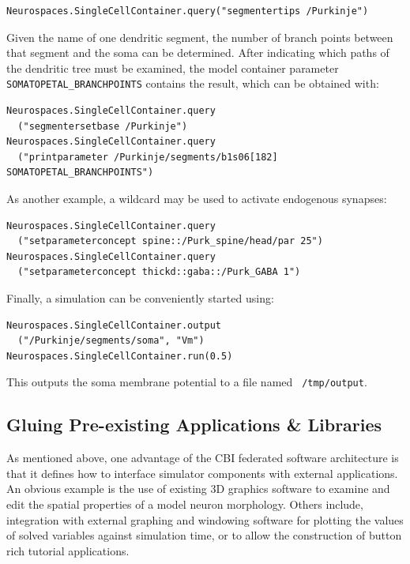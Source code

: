 \documentclass[12pt]{article}
\begin{document}
{\footnotesize
\begin{verbatim}
Neurospaces.SingleCellContainer.query("segmentertips /Purkinje")
\end{verbatim}
}

Given the name of one dendritic segment, the number of branch points
between that segment and the soma can be determined. After indicating
which paths of the dendritic tree must be examined, the model
container parameter {\tt SOMATOPETAL\_BRANCHPOINTS} contains the
result, which can be obtained with:

{\footnotesize
\begin{verbatim}
Neurospaces.SingleCellContainer.query
  ("segmentersetbase /Purkinje")
Neurospaces.SingleCellContainer.query
  ("printparameter /Purkinje/segments/b1s06[182] SOMATOPETAL_BRANCHPOINTS")
\end{verbatim}
}

As another example, a wildcard may be used to activate endogenous
synapses:

{\footnotesize
\begin{verbatim}
Neurospaces.SingleCellContainer.query
  ("setparameterconcept spine::/Purk_spine/head/par 25")
Neurospaces.SingleCellContainer.query
  ("setparameterconcept thickd::gaba::/Purk_GABA 1")
\end{verbatim}
}

Finally, a simulation can be conveniently started using:

{\footnotesize
\begin{verbatim}
Neurospaces.SingleCellContainer.output
  ("/Purkinje/segments/soma", "Vm")
Neurospaces.SingleCellContainer.run(0.5)
\end{verbatim}
}

This outputs the soma membrane potential to a file named {\tt
  /tmp/output}.


\subsection{Gluing Pre-existing Applications \& Libraries}

As mentioned above, one advantage of the CBI federated software
architecture is that it defines how to interface simulator components
with external applications.  An obvious example is the use of existing
3D graphics software to examine and edit the spatial properties of a
model neuron morphology.  Others include, integration with external
graphing and windowing software for plotting the values of solved
variables against simulation time, or to allow the construction of
button rich tutorial applications.
\end{document}
